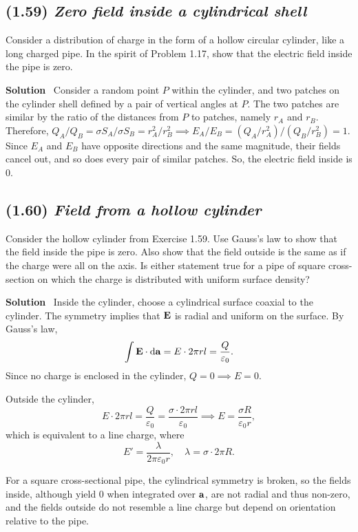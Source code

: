 \documentclass[hidelinks]{article}
\begin{document}
\subsection{(1.59) \textit{Zero field inside a cylindrical shell}}
Consider a distribution of charge in the form of a hollow circular cylinder, like a long charged pipe. In the spirit of Problem 1.17, show that the electric field inside the pipe is zero.

\vspace{0.5cm}
\noindent
\textbf{Solution} \, Consider a random point $P$ within the cylinder, and two patches on the cylinder shell defined by a pair of vertical angles at $P$. The two patches are similar by the ratio of the distances from $P$ to patches, namely $r_A$ and $r_B$. Therefore, $Q_A/Q_B=\sigma S_A/ \sigma S_B=r_A^2 / r_B^2 \implies E_A /E_B = (Q_A/r_A^2) / (Q_B/r_B^2) = 1$. Since $E_A$ and $E_B$ have opposite directions and the same magnitude, their fields cancel out, and so does every pair of similar patches. So, the electric field inside is $0$.

\subsection{(1.60) \textit{Field from a hollow cylinder}}
Consider the hollow cylinder from Exercise 1.59. Use Gauss’s law to show that the field inside the pipe is zero. Also show that the field outside is the same as if the charge were all on the axis. Is either statement true for a pipe of square cross-section on which the charge is distributed with uniform surface density?

\vspace{0.5cm}
\noindent
\textbf{Solution} \, Inside the cylinder, choose a cylindrical surface coaxial to the cylinder. The symmetry implies that $\vb{E}$ is radial and uniform on the surface. By Gauss's law, $$\int \vb{E} \cdot \mathrm{d} \vb{a} = E \cdot 2\pi rl = \frac{Q}{\varepsilon_0}.$$ Since no charge is enclosed in the cylinder, $Q=0 \implies E =0$.

Outside the cylinder, 
$$E \cdot 2\pi rl = \frac{Q}{ \varepsilon_0} = \frac{\sigma \cdot 2 \pi rl}{\varepsilon_0} \implies E= \frac{\sigma R}{\varepsilon_0 r},$$
which is equivalent to a line charge, where
$$E'=\frac {\lambda}{2\pi \varepsilon_0 r}, \quad \lambda= \sigma \cdot 2\pi R.$$ 

For a square cross-sectional pipe, the cylindrical symmetry is broken, so the fields inside, although yield $0$ when integrated over $\vb{a}$, are not radial and thus non-zero, and the fields outside do not resemble a line charge but depend on orientation relative to the pipe.
\end{document}
